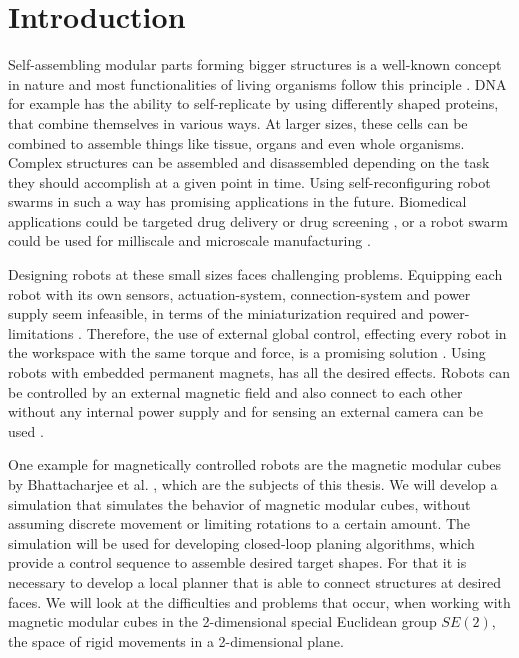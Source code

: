 \chapter{Introduction}

Self-assembling modular parts forming bigger structures is a well-known concept in nature and most functionalities of living organisms follow this principle \cite{bishop2005}.
DNA for example has the ability to self-replicate by using differently shaped proteins, that combine themselves in various ways.
At larger sizes, these cells can be combined to assemble things like tissue, organs and even whole organisms.
Complex structures can be assembled and disassembled depending on the task they should accomplish at a given point in time. 
Using self-reconfiguring robot swarms in such a way has promising applications in the future.
Biomedical applications could be targeted drug delivery or drug screening \cite{sitti2015}, or a robot swarm could be used for milliscale and microscale manufacturing \cite{pelrine2016}.

Designing robots at these small sizes faces challenging problems.
Equipping each robot with its own sensors, actuation-system, connection-system and power supply seem infeasible, in terms of the miniaturization required and power-limitations \cite{white2007}.
Therefore, the use of external global control, effecting every robot in the workspace with the same torque and force, is a promising solution \cite{white2007}.
Using robots with embedded permanent magnets, has all the desired effects.
Robots can be controlled by an external magnetic field and also connect to each other without any internal power supply and for sensing an external camera can be used \cite{saab2019}.

One example for magnetically controlled robots are the magnetic modular cubes by Bhattacharjee et al. \cite{Bhattacharjee2022}, which are the subjects of this thesis.
We will develop a simulation that simulates the behavior of magnetic modular cubes, without assuming discrete movement or limiting rotations to a certain amount.
The simulation will be used for developing closed-loop planing algorithms, which provide a control sequence to assemble desired target shapes.
For that it is necessary to develop a local planner that is able to connect structures at desired faces.
We will look at the difficulties and problems that occur, when working with magnetic modular cubes in the 2-dimensional special Euclidean group \(SE(2)\), the space of rigid movements in a 2-dimensional plane.



